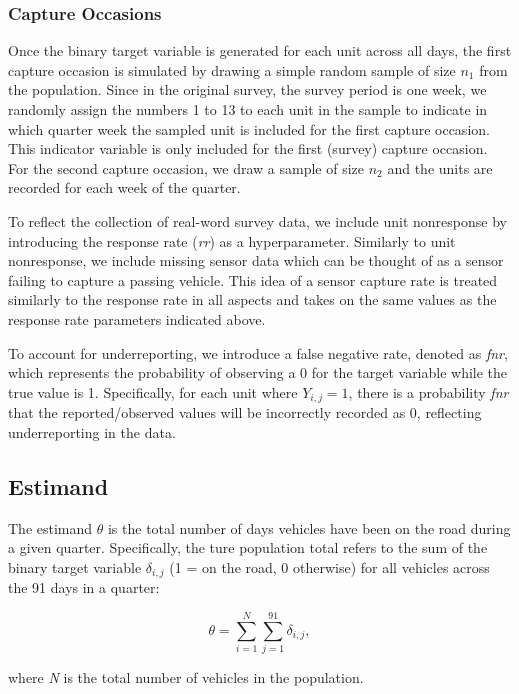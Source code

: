 \documentclass[12pt, a4paper]{article}
\begin{document}
\subsubsection*{Capture Occasions}
Once the binary target variable is generated for each unit across all days, the first capture occasion is simulated by drawing a simple random sample of size $n_1$ from the population. Since in the original survey, the survey period is one week, we randomly assign the numbers 1 to 13 to each unit in the sample to indicate in which quarter week the sampled unit is included for the first capture occasion. This indicator variable is only included for the first (survey) capture occasion. For the second capture occasion, we draw a sample of size $n_2$ and the units are  recorded for each week of the quarter. \par

To reflect the collection of real-word survey data, we include unit nonresponse by introducing the response rate (\textit{rr}) as a hyperparameter. Similarly to unit nonresponse, we include missing sensor data which can be thought of as a sensor failing to capture a passing vehicle. This idea of a sensor capture rate is treated similarly to the response rate in all aspects and takes on the same values as the response rate parameters indicated above.\par

To account for underreporting, we introduce a false negative rate, denoted as \textit{fnr}, which represents the probability of observing a 0 for the target variable while the true value is 1. Specifically, for each unit where $Y_{i,j} = 1$, there is a probability \textit{fnr} that the reported/observed values will be incorrectly recorded as 0, reflecting underreporting in the data.


\subsection{Estimand}
\noindent The estimand $\theta$ is the total number of days vehicles have been on the road during a given quarter. Specifically, the ture population total refers to the sum of the binary target variable $\delta_{i,j}$ (1 = on the road, 0 otherwise) for all vehicles across the 91 days in a quarter: 

$$\theta = \sum_{i=1}^N \sum_{j=1}^{91} \delta_{i,j},$$

\noindent where \textit{N} is the total number of vehicles in the population. \par
\end{document}
